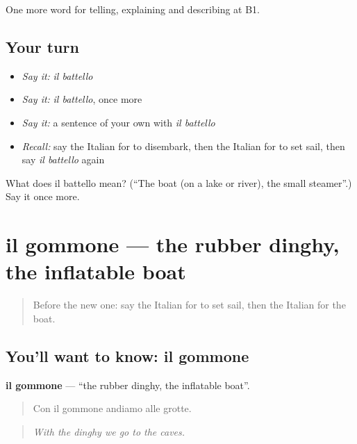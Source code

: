 \begin{grammarlens}[title={What you've built}]
One more word for telling, explaining and describing at B1.
\end{grammarlens}

\subsection*{Your turn}
\begin{itemize}
\raggedright
  \item \emph{Say it:} \emph{il battello}
  \item \emph{Say it:} \emph{il battello}, once more
  \item \emph{Say it:} a sentence of your own with \emph{il battello}
  \item \emph{Recall:} say the Italian for to disembark, then the Italian for to set sail, then say \emph{il battello} again
\end{itemize}

\begin{tcolorbox}[breakable,colback=teal!4,colframe=teal!35!black,title={Before you move on}]
What does il battello mean? (\textquotedblleft{}The boat (on a lake or river), the small steamer\textquotedblright{}.) Say it once more.
\end{tcolorbox}
\section[il gommone]{il gommone — the rubber dinghy, the inflatable boat}

\label{lesson:IT-C422-gommone}



\begin{quote}
Before the new one: say the Italian for to set sail, then the Italian for the boat.
\end{quote}

\subsection*{You'll want to know: il gommone}
\textbf{il gommone} — \textquotedblleft{}the rubber dinghy, the inflatable boat\textquotedblright{}.

\begin{quote}
Con il gommone andiamo alle grotte.
\end{quote}

\begin{quote}
\emph{With the dinghy we go to the caves.}
\end{quote}

